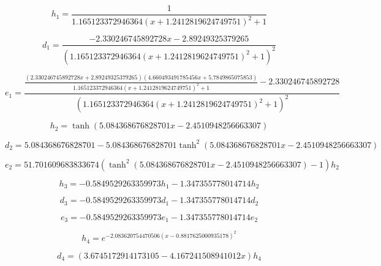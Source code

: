 \begin{equation}
h_{1}=\frac{1}{1.165123372946364 \left(x + 1.2412819624749751\right)^{2} + 1}
\end{equation}


\begin{equation}
d_{1}=\frac{- 2.330246745892728 x - 2.89249325379265}{\left(1.165123372946364 \left(x + 1.2412819624749751\right)^{2} + 1\right)^{2}}
\end{equation}


\begin{equation}
e_{1}=\frac{\frac{\left(2.330246745892728 x + 2.89249325379265\right) \left(4.660493491785456 x + 5.7849865075853\right)}{1.165123372946364 \left(x + 1.2412819624749751\right)^{2} + 1} - 2.330246745892728}{\left(1.165123372946364 \left(x + 1.2412819624749751\right)^{2} + 1\right)^{2}}
\end{equation}


\begin{equation}
h_{2}=\tanh{\left(5.084368676828701 x - 2.4510948256663307 \right)}
\end{equation}


\begin{equation}
d_{2}=5.084368676828701 - 5.084368676828701 \tanh^{2}{\left(5.084368676828701 x - 2.4510948256663307 \right)}
\end{equation}


\begin{equation}
e_{2}=51.701609683833674 \left(\tanh^{2}{\left(5.084368676828701 x - 2.4510948256663307 \right)} - 1\right) h_{2}
\end{equation}


\begin{equation}
h_{3}=- 0.5849529263359973 h_{1} - 1.347355778014714 h_{2}
\end{equation}


\begin{equation}
d_{3}=- 0.5849529263359973 d_{1} - 1.347355778014714 d_{2}
\end{equation}


\begin{equation}
e_{3}=- 0.5849529263359973 e_{1} - 1.347355778014714 e_{2}
\end{equation}


\begin{equation}
h_{4}=e^{- 2.083620754470506 \left(x - 0.8817625000935178\right)^{2}}
\end{equation}


\begin{equation}
d_{4}=\left(3.6745172914173105 - 4.167241508941012 x\right) h_{4}
\end{equation}


